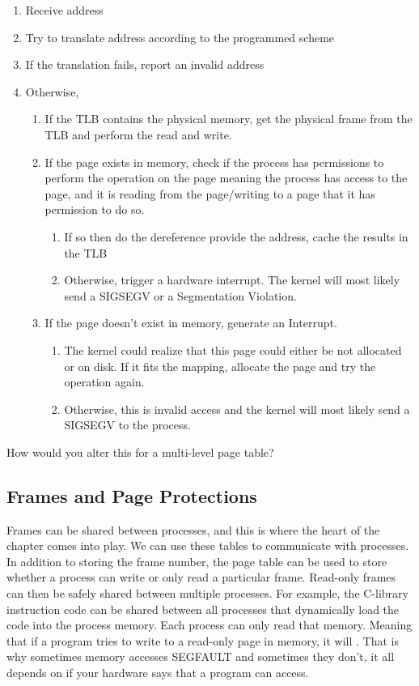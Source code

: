 	\begin{enumerate}
	\item Receive address
	\item Try to translate address according to the programmed scheme
	\item If the translation fails, report an invalid address
	\item Otherwise,
		\begin{enumerate}
	 \item If the TLB contains the physical memory, get the physical frame from the TLB and perform the read and write.
		\item If the page exists in memory, check if the process has permissions
	 to perform the operation on the page meaning the process has access
	 to the page, and it is reading from the page/writing to a page
	 that it has permission to do so.
	 \begin{enumerate}
	 \item If so then do the dereference provide the address, cache the results in the TLB
	 \item Otherwise, trigger a hardware interrupt. The kernel
	 will most likely send a SIGSEGV or a Segmentation Violation.
	 \end{enumerate}
		\item If the page doesn't exist in memory, generate an Interrupt.
	 \begin{enumerate}
	 \item The kernel could realize that this page could either be not
	 allocated or on disk.
	 If it fits the mapping, allocate the page and try the operation again.
	 \item Otherwise, this is invalid access and the kernel will most likely send a SIGSEGV to the process.
	 \end{enumerate}
		\end{enumerate}
	\end{enumerate}
	 
	How would you alter this for a multi-level page table?
	 
	\subsection{Frames and Page Protections}
	 
	Frames can be shared between processes, and this is where the heart of the chapter comes into play.
	We can use these tables to communicate with processes.
	In addition to storing the frame number, the page table can be used to store whether a process can write or only read a particular frame.
	Read-only frames can then be safely shared between multiple processes.
	For example, the C-library instruction code can be shared between all processes that dynamically load the code into the process memory.
	Each process can only read that memory.
	Meaning that if a program tries to write to a read-only page in memory, it will .
	That is why sometimes memory accesses SEGFAULT and sometimes they don't, it all depends on if your hardware says that a program can access.
	 
